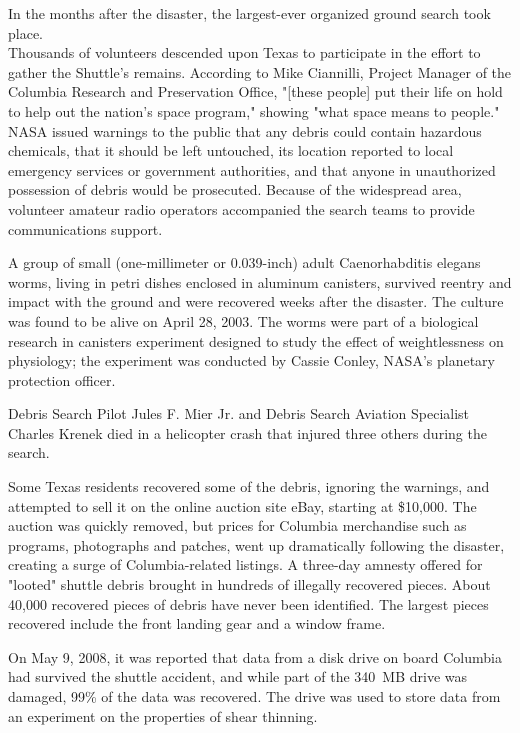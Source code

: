 In the months after the disaster, the largest-ever organized ground
search took place.\\
Thousands of volunteers descended upon Texas to participate in the
effort to gather the Shuttle's remains. According to Mike Ciannilli,
Project Manager of the Columbia Research and Preservation Office,
"{[}these people{]} put their life on hold to help out the nation's
space program," showing "what space means to people."\\
NASA issued warnings to the public that any debris could contain
hazardous chemicals, that it should be left untouched, its location
reported to local emergency services or government authorities, and that
anyone in unauthorized possession of debris would be prosecuted. Because
of the widespread area, volunteer amateur radio operators accompanied
the search teams to provide communications support.

A group of small (one-millimeter or 0.039-inch) adult Caenorhabditis
elegans worms, living in petri dishes enclosed in aluminum canisters,
survived reentry and impact with the ground and were recovered weeks
after the disaster. The culture was found to be alive on April 28, 2003.
The worms were part of a biological research in canisters experiment
designed to study the effect of weightlessness on physiology; the
experiment was conducted by Cassie Conley, NASA's planetary protection
officer.

Debris Search Pilot Jules F. Mier Jr. and Debris Search Aviation
Specialist Charles Krenek died in a helicopter crash that injured three
others during the search.

Some Texas residents recovered some of the debris, ignoring the
warnings, and attempted to sell it on the online auction site eBay,
starting at \$10,000. The auction was quickly removed, but prices for
Columbia merchandise such as programs, photographs and patches, went up
dramatically following the disaster, creating a surge of
Columbia-related listings. A three-day amnesty offered for "looted"
shuttle debris brought in hundreds of illegally recovered pieces. About
40,000 recovered pieces of debris have never been identified. The
largest pieces recovered include the front landing gear and a window
frame.

On May 9, 2008, it was reported that data from a disk drive on board
Columbia had survived the shuttle accident, and while part of the 340~MB
drive was damaged, 99\% of the data was recovered. The drive was used to
store data from an experiment on the properties of shear thinning.

